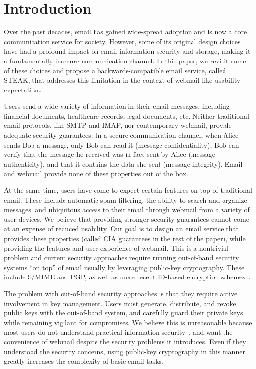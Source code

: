 \section{Introduction}

Over the past decades, email has gained wide-spread adoption 
and is now a core communication service for society. However, 
some of its original design choices have had a profound impact 
on email information security and storage, making it a fundamentally
insecure communication channel. In this paper, we revisit some 
of these choices and propose a backwards-compatible email service, 
called STEAK, that addresses this limitation in the context of 
webmail-like usability expectations.

Users send a wide variety of information in their email messages, 
including financial documents, healthcare records, legal documents, etc.
Neither traditional email protocols, like SMTP and IMAP, nor contemporary
webmail, provide adequate security guarantees.
In a secure communication channel, when Alice sends 
Bob a message, only Bob can read it (message confidentiality), Bob can 
verify that the message he received was in fact sent by Alice (message 
authenticity), and that it contains the data she sent (message integrity). 
Email and webmail provide none of these properties out of the box. 

At the same time, users have come to expect certain features on top of 
traditional email.  These include automatic spam filtering, the ability 
to search and organize messages, and ubiquitous access to their email 
through webmail from a variety of user devices. We believe that providing 
stronger security guarantees cannot come at an expense of reduced usability. 
Our goal is to design an email service that provides these properties 
(called CIA guarantees in the rest of the paper), while providing the 
features and user experience of webmail.  This is a nontrivial problem 
and current security approaches require running out-of-band security 
systems ``on top'' of email usually by leveraging public-key cryptography. 
These include S/MIME and PGP, as well as more recent ID-based encryption 
schemes~\cite{id-based-cryptography}.

The problem with out-of-band security approaches is that they require
 active involvement in key management. 
Users must generate, distribute, and revoke public keys with the out-of-band 
system, and carefully guard their private keys while remaining vigilant 
for compromises. We believe this is unreasonable because most users do 
not understand practical information security~\cite{garfinkel-email-survey}, 
and want the convenience 
of webmail despite the security problems it introduces. Even if they 
understood the security concerns, using public-key cryptography in this 
manner greatly increases the complexity of basic email tasks. 

